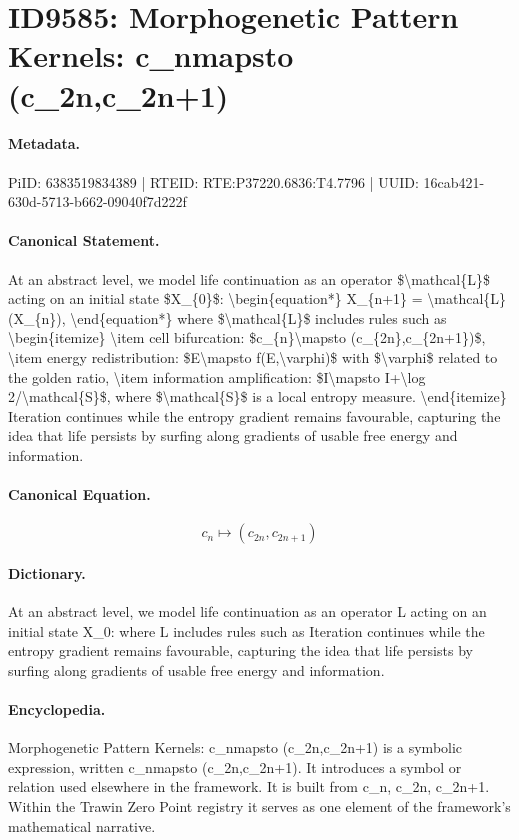 \section*{ID9585: Morphogenetic Pattern Kernels: c\_nmapsto (c\_2n,c\_2n+1)}
\paragraph{Metadata.}
PiID: 6383519834389 | RTEID: RTE:P37220.6836:T4.7796 | UUID: 16cab421-630d-5713-b662-09040f7d222f

\paragraph{Canonical Statement.}
At an abstract level, we model life continuation as an operator \$\textbackslash{}mathcal\{L\}\$ acting on an initial state \$X\_\{0\}\$: \textbackslash{}begin\{equation*\} X\_\{n+1\} = \textbackslash{}mathcal\{L\}(X\_\{n\}), \textbackslash{}end\{equation*\} where \$\textbackslash{}mathcal\{L\}\$ includes rules such as \textbackslash{}begin\{itemize\} \textbackslash{}item cell bifurcation: \$c\_\{n\}\textbackslash{}mapsto (c\_\{2n\},c\_\{2n+1\})\$, \textbackslash{}item energy redistribution: \$E\textbackslash{}mapsto f(E,\textbackslash{}varphi)\$ with \$\textbackslash{}varphi\$ related to the golden ratio, \textbackslash{}item information amplification: \$I\textbackslash{}mapsto I+\textbackslash{}log 2/\textbackslash{}mathcal\{S\}\$, where \$\textbackslash{}mathcal\{S\}\$ is a local entropy measure. \textbackslash{}end\{itemize\} Iteration continues while the entropy gradient remains favourable, capturing the idea that life persists by surfing along gradients of usable free energy and information.

\paragraph{Canonical Equation.}
\[
c_{n}\mapsto (c_{2n},c_{2n+1})
\]

\paragraph{Dictionary.}
At an abstract level, we model life continuation as an operator L acting on an initial state X\_0: where L includes rules such as Iteration continues while the entropy gradient remains favourable, capturing the idea that life persists by surfing along gradients of usable free energy and information.

\paragraph{Encyclopedia.}
Morphogenetic Pattern Kernels: c\_nmapsto (c\_2n,c\_2n+1) is a symbolic expression, written c\_nmapsto (c\_2n,c\_2n+1). It introduces a symbol or relation used elsewhere in the framework. It is built from c\_n, c\_2n, c\_2n+1. Within the Trawin Zero Point registry it serves as one element of the framework's mathematical narrative.
